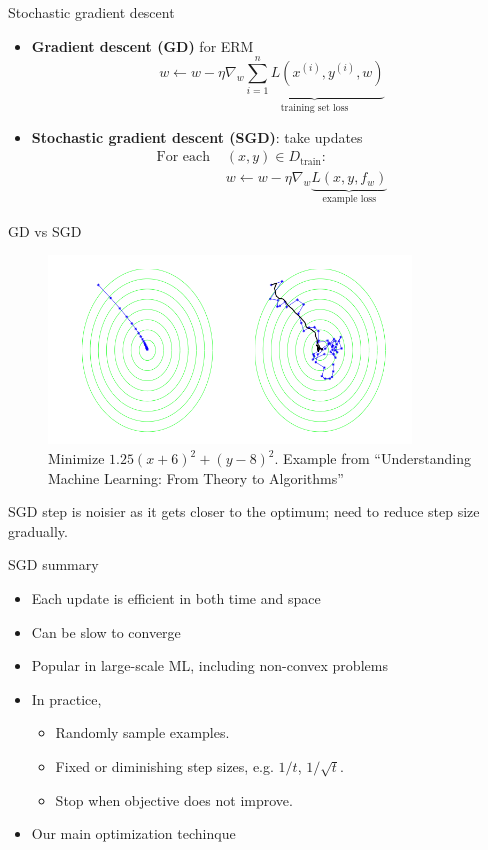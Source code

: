 \documentclass[usenames,dvipsnames,notes,11pt,aspectratio=169]{beamer}
\begin{document}
\begin{frame}
    {Stochastic gradient descent}
    \begin{itemize}
        \item \textbf{Gradient descent (GD)} for ERM
            $$
            w \leftarrow w - \eta\nabla_w \underbrace{\sum_{i=1}^n L(x^{(i)}, y^{(i)}, w)}_{\textstyle{\text{training set loss}}}
            $$
            \pause
        \item \textbf{Stochastic gradient descent (SGD)}: take  updates\\
            \begin{align*}
                \text{For each } &(x, y) \in D_{\text{train}}:\\
                &w \leftarrow w - \eta\nabla_w \underbrace{L(x, y, f_w)}_{\textstyle{\text{example loss}}}
            \end{align*}
    \end{itemize}
\end{frame}

\begin{frame}
    {GD vs SGD}
    \begin{figure}
        \caption{Minimize $1.25(x + 6)^2 + (y - 8)^2$. Example from ``Understanding Machine Learning: From Theory to Algorithms''}
        \includegraphics[height=5cm]{figures/gd-vs-sgd}
    \end{figure}
    SGD step is noisier as it gets closer to the optimum; need to reduce step size gradually.
\end{frame}

\begin{frame}
    {SGD summary}
    \begin{itemize}
        \itemsep1em
        \item Each update is efficient in both time and space
        \item Can be slow to converge 
        \item Popular in large-scale ML, including non-convex problems
        \item In practice, 
            \begin{itemize}
                \item Randomly sample examples.
                \item Fixed or diminishing step sizes, e.g. $1/t$, $1/\sqrt{t}$.
                \item Stop when objective does not improve.
            \end{itemize}
        \item Our main optimization techinque
    \end{itemize}
\end{frame}
\end{document}
